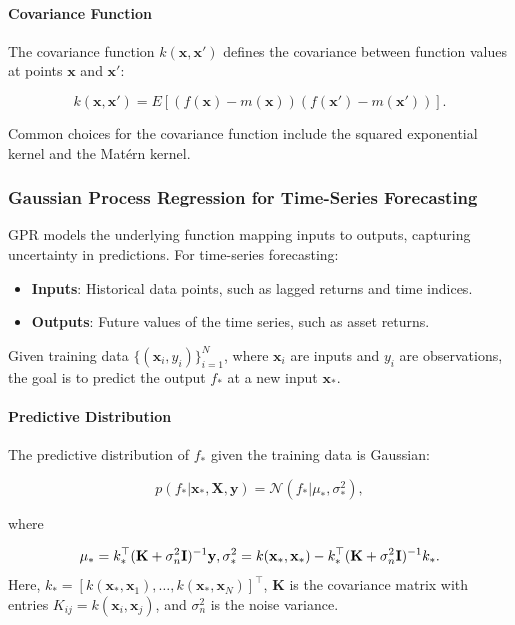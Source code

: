 \paragraph{Covariance Function}

The covariance function $k(\mathbf{x}, \mathbf{x}')$ defines the covariance between function values at points $\mathbf{x}$ and $\mathbf{x}'$:

\begin{equation}
    k(\mathbf{x}, \mathbf{x}') = E\left[ (f(\mathbf{x}) - m(\mathbf{x}))(f(\mathbf{x}') - m(\mathbf{x}')) \right].
\end{equation}

Common choices for the covariance function include the squared exponential kernel and the Matérn kernel.

\subsubsection{Gaussian Process Regression for Time-Series Forecasting}

GPR models the underlying function mapping inputs to outputs, capturing uncertainty in predictions. For time-series forecasting:

\begin{itemize}
    \item \textbf{Inputs}: Historical data points, such as lagged returns and time indices.
    \item \textbf{Outputs}: Future values of the time series, such as asset returns.
\end{itemize}

Given training data $\{ (\mathbf{x}_i, y_i) \}_{i=1}^N$, where $\mathbf{x}_i$ are inputs and $y_i$ are observations, the goal is to predict the output $f_*$ at a new input $\mathbf{x}_*$.

\paragraph{Predictive Distribution}

The predictive distribution of $f_*$ given the training data is Gaussian:

\begin{equation}
    p(f_* | \mathbf{x}_*, \mathbf{X}, \mathbf{y}) = \mathcal{N}\left( f_* | \mu_*, \sigma_*^2 \right),
\end{equation}

where

\begin{equation}
    \mu_* = k_*^\top (\mathbf{K} + \sigma_n^2 \mathbf{I})^{-1} \mathbf{y}, \\
    \sigma_*^2 = k(\mathbf{x}_*, \mathbf{x}_*) - k_*^\top (\mathbf{K} + \sigma_n^2 \mathbf{I})^{-1} k_*.
\end{equation}
Here, $k_* = [k(\mathbf{x}_*, \mathbf{x}_1), \dots, k(\mathbf{x}_*, \mathbf{x}_N)]^\top$, $\mathbf{K}$ is the covariance matrix with entries $K_{ij} = k(\mathbf{x}_i, \mathbf{x}_j)$, and $\sigma_n^2$ is the noise variance.

